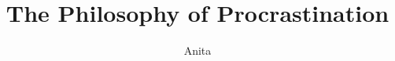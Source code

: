 \documentclass[
]{dissertation}
\title[Exploring the `Putting Things Off' Productivity System]{The Philosophy of Procrastination}
\author{Anita}{Break}
\begin{document}
  \frontmatter

  
  
  
  
  
  

  \mainmatter
  \thumbtrue    %

  
  
  

  \appendix

  

  \backmatter
  \thumbfalse   %

  
  
  
  
  
\end{document}
